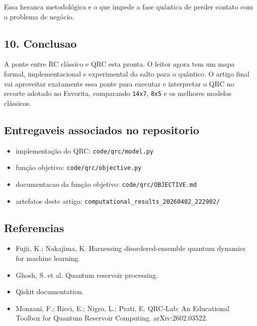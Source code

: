 \documentclass[12pt]{article}
\providecommand{\tightlist}{%
          \setlength{\itemsep}{0pt}\setlength{\parskip}{0pt}}
\begin{document}
Essa heranca metodológica e o que impede a fase quântica de perder contato com o problema de negócio.

\subsection{10. Conclusao}\label{10-conclusao}

A ponte entre RC clássico e QRC esta pronta. O leitor agora tem um mapa formal, implementacional e experimental do salto para o quântico. O artigo final vai aproveitar exatamente essa ponte para executar e interpretar o QRC no recorte adotado no Favorita, comparando \texttt{14x7}, \texttt{8x5} e os melhores modelos clássicos.

\subsection{Entregaveis associados no repositorio}\label{entregaveis-associados-no-repositorio}

\begin{itemize}
\tightlist
\item
  implementação do QRC: \texttt{code/qrc/model.py}
\item
  função objetivo: \texttt{code/qrc/objective.py}
\item
  documentacao da função objetivo: \texttt{code/qrc/OBJECTIVE.md}
\item
  artefatos deste artigo: \texttt{computational\_results\_20260402\_222902/}
\end{itemize}

\subsection{Referencias}\label{referencias}

\begin{itemize}
\tightlist
\item
  Fujii, K.; Nakajima, K. Harnessing disordered-ensemble quantum dynamics for machine learning.
\item
  Ghosh, S. et al. Quantum reservoir processing.
\item
  Qiskit documentation.
\item
  Monzani, F.; Ricci, E.; Nigro, L.; Prati, E. QRC-Lab: An Educational Toolbox for Quantum Reservoir Computing. arXiv:2602.03522.
\end{itemize}

        
\end{document}
